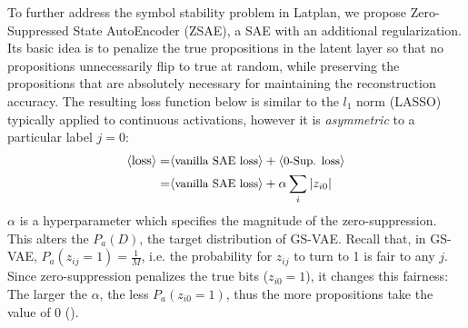 
To further address the symbol stability problem in Latplan,
we propose Zero-Suppressed State AutoEncoder (ZSAE),
a SAE with an additional regularization.
% 
Its basic idea is to penalize the
true propositions in the latent layer so that no propositions unnecessarily flip to true at random,
while preserving the propositions that are absolutely necessary for maintaining the reconstruction accuracy.
% 
The resulting loss function below is similar to the $l_1$ norm (LASSO) typically
applied to continuous activations, however it is \emph{asymmetric} to a particular label $j=0$:
\begin{align*}
 \brackets{\text{loss}} = & \brackets{\text{\small vanilla SAE loss}} + \brackets{\text{\small 0-Sup. loss}} \\ 
 =                        & \brackets{\text{\small vanilla SAE loss}} + \alpha \sum_i |z_{i0}|
\end{align*}
$\alpha$ is a hyperparameter which specifies the magnitude of the zero-suppression.
% 
This alters the $P_a(D)$, the target distribution of GS-VAE.
Recall that, in GS-VAE, $P_a(z_{ij}=1)=\frac{1}{M}$, i.e. the probability for $z_{ij}$ to turn to 1 is fair to any $j$.
Since zero-suppression penalizes the true bits ($z_{i0}=1$), it changes this fairness: The larger the $\alpha$,
the less $P_a(z_{i0}=1)$,
thus the more propositions take the value of 0 ().

